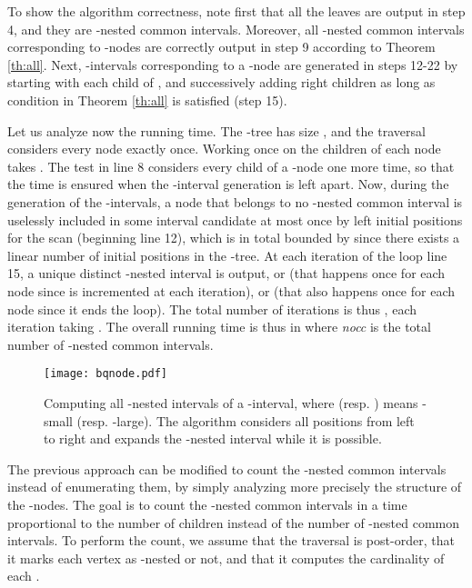 \documentclass{article}
\begin{document}
\begin{preuve} To show the algorithm correctness, note first that 
all the leaves are output in step 4, and they are -nested common
intervals. Moreover, all -nested common intervals corresponding to
-nodes are correctly output in step 9 according to Theorem
\ref{th:all}. Next, -intervals corresponding to a -node 
are generated in steps 12-22 by starting with each child  of ,
and successively adding right children  as long as condition
 in Theorem \ref{th:all} is satisfied (step 15).


Let us analyze now the running time. The -tree has size , and the traversal considers
every node  exactly once. Working once on the children of each node
takes . The test in line 8 considers every child of a -node
one more time, so that the  time is ensured when the -interval
generation is left apart. Now, during the generation of the
-intervals, a node  that belongs to no -nested common
interval is uselessly included in some interval candidate at most once
by left initial positions for the scan (beginning line 12), which is
in total bounded by  since there exists a linear number of initial
positions in the -tree. At each iteration of
the loop line 15, a unique distinct -nested interval is output, or
 (that happens once for each node since  is incremented at
each iteration), or  (that also happens once for each node
since it ends the loop). The total number of iterations is thus
, each iteration taking . The overall running 
time is thus in  where {\em nocc} is the
total number of -nested common intervals.
\end{preuve}

\begin{figure}[t]
\vspace{-0.3cm}
  \centering
\texttt{[image: bqnode.pdf]} 
\caption{Computing all -nested intervals of a -interval, where
   (resp. ) means -small (resp. -large). The algorithm
  considers all positions from left to right and expands the -nested
  interval while it is possible.}
 \label{fig:algo}
\vspace{-0.3cm}
\end{figure}



The previous approach can be modified to count the -nested common 
intervals instead of enumerating them, by simply analyzing more
precisely the structure of the -nodes. The goal is to count the -nested
common intervals in a time proportional to the number of children instead of the
number of -nested common intervals. To perform the count, we assume that the traversal is post-order, that it marks each
vertex as -nested or not, and that it computes the cardinality of each . 
\end{document}
